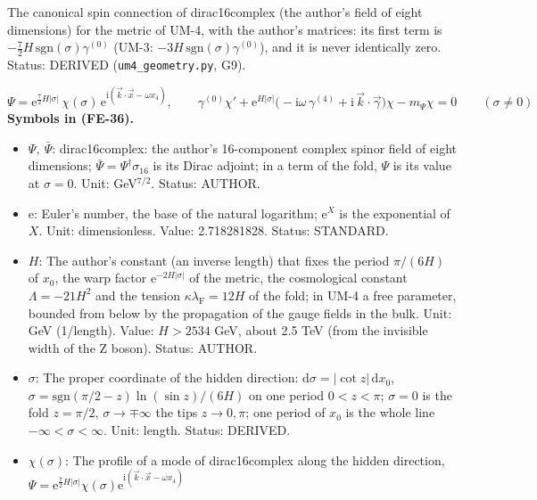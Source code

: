 \documentclass[
  10pt,
]{article}
\providecommand{\tightlist}{%
  \setlength{\itemsep}{0pt}\setlength{\parskip}{0pt}}
\begin{document}
The canonical spin connection of dirac16complex (the author's field of
eight dimensions) for the metric of UM-4, with the author's matrices:
its first term is \(-\frac72H\,\mathrm{sgn}(\sigma)\gamma^{(0)}\) (UM-3:
\(-3H\,\mathrm{sgn}(\sigma)\gamma^{(0)}\)), and it is never identically
zero. Status: DERIVED (\texttt{um4\_geometry.py}, G9).

\[
\Psi = \mathrm{e}^{\frac72H\lvert\sigma\rvert}\,\chi(\sigma)\,\mathrm{e}^{\mathrm{i}(\vec k\cdot\vec x - \omega x_4)},\qquad
\gamma^{(0)}\chi' + \mathrm{e}^{H\lvert\sigma\rvert}\big(-\mathrm{i}\omega\,\gamma^{(4)} + \mathrm{i}\,\vec k\cdot\vec\gamma\big)\chi
 - m_\Psi\chi = 0\qquad(\sigma \ne 0) \tag{FE-36}
\] \textbf{Symbols in (FE-36).}

\begin{itemize}
\tightlist
\item
  \(\Psi,\ \bar\Psi\): dirac16complex: the author's 16-component complex
  spinor field of eight dimensions;
  \(\bar\Psi = \Psi^\dagger\sigma_{16}\) is its Dirac adjoint; in a term
  of the fold, \(\Psi\) is its value at \(\sigma = 0\). Unit:
  GeV\(^{7/2}\). Status: AUTHOR.
\item
  \(\mathrm{e}\): Euler's number, the base of the natural logarithm;
  \(\mathrm{e}^{X}\) is the exponential of \(X\). Unit: dimensionless.
  Value: 2.718281828. Status: STANDARD.
\item
  \(H\): The author's constant (an inverse length) that fixes the period
  \(\pi/(6H)\) of \(x_0\), the warp factor
  \(\mathrm{e}^{-2H\lvert\sigma\rvert}\) of the metric, the cosmological
  constant \(\Lambda = -21H^2\) and the tension
  \(\kappa\lambda_{\mathrm{F}} = 12H\) of the fold; in UM-4 a free
  parameter, bounded from below by the propagation of the gauge fields
  in the bulk. Unit: GeV (1/length). Value: \(H > 2534\) GeV, about 2.5
  TeV (from the invisible width of the Z boson). Status: AUTHOR.
\item
  \(\sigma\): The proper coordinate of the hidden direction:
  \(\mathrm{d}\sigma = \lvert\cot z\rvert\,\mathrm{d}x_0\),
  \(\sigma = \mathrm{sgn}(\pi/2 - z)\ln(\sin z)/(6H)\) on one period
  \(0 < z < \pi\); \(\sigma = 0\) is the fold \(z = \pi/2\),
  \(\sigma \to \mp\infty\) the tips \(z \to 0, \pi\); one period of
  \(x_0\) is the whole line \(-\infty < \sigma < \infty\). Unit: length.
  Status: DERIVED.
\item
  \(\chi(\sigma)\): The profile of a mode of dirac16complex along the
  hidden direction,
  \(\Psi = \mathrm{e}^{\frac72H\lvert\sigma\rvert}\chi(\sigma)\mathrm{e}^{\mathrm{i}(\vec k\cdot\vec x - \omega x_4)}\)

\end{itemize}
\end{document}
